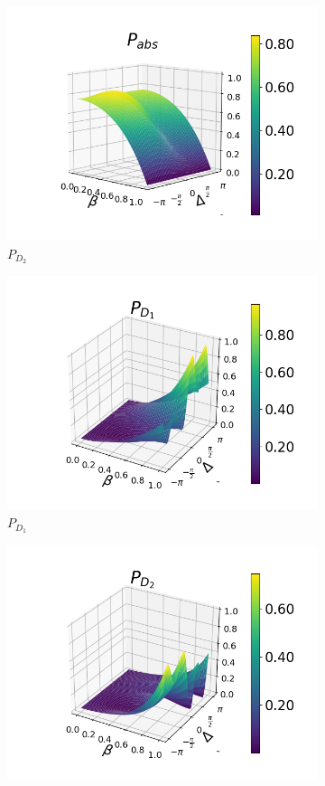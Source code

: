 \documentclass[12pt]{book}
\begin{document}
\begin{figure}[H]
\begin{subfigure}[b]{0.3\linewidth}
\includegraphics[width=\linewidth]{images/pabs_3_pi4.png}
\caption{$P_{D_{2}}$ }
\label{fig:BS1}
\end{subfigure}
\begin{subfigure}[b]{0.3\linewidth}
\includegraphics[width=\linewidth]{images/pd1_5_pi4.png}
\caption{$P_{D_{1}}$ }
\label{fig:BS1}
\end{subfigure}
\begin{subfigure}[b]{0.3\linewidth}
\includegraphics[width=\linewidth]{images/pd2_5_pi4.png}

\end{subfigure}
\end{figure}
\end{document}
